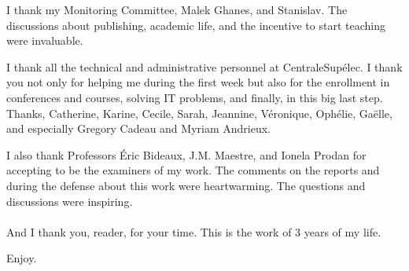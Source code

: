 \documentclass[../main.tex]{subfiles}
\begin{document}
I thank my Monitoring Committee, Malek Ghanes, and Stanislav.
The discussions about publishing, academic life, and the incentive to start teaching were invaluable.

I thank all the technical and administrative personnel at CentraleSupélec. I thank you not only for helping me during the first week but also for the enrollment in conferences and courses, solving IT problems, and finally, in this big last step. Thanks, Catherine, Karine, Cecile, Sarah, Jeannine, Véronique, Ophélie, Gaëlle, and especially Gregory Cadeau and Myriam Andrieux.

I also thank Professors Éric Bideaux, J.M. Maestre, and Ionela Prodan for accepting to be the examiners of my work.
The comments on the reports and during the defense about this work were heartwarming. The questions and discussions were inspiring.
\\~\\
And I thank you, reader, for your time. This is the work of 3 years of my life.

Enjoy.
\vfill
\end{document}
